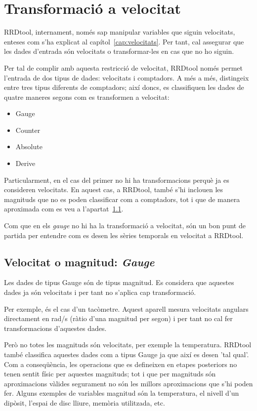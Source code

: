 \section[Transformació]{Transformació a velocitat}
\label{sec:rrdtool-etapes:velocitat}

RRDtool, internament, només sap manipular variables que siguin velocitats, enteses com s'ha explicat al capítol~\ref{cap:velocitats}. Per tant, cal assegurar que les dades d'entrada són velocitats o transformar-les en cas que no ho siguin. 

Per tal de complir amb aquesta restricció de velocitat, RRDtool només permet l'entrada de dos tipus de dades: velocitats i comptadors. A més a més, distingeix entre tres tipus diferents de comptadors; així doncs, es classifiquen les dades de quatre maneres segons com es transformen a velocitat:

\begin{itemize}
\item Gauge 
\item Counter
\item Absolute
\item Derive
\end{itemize}

Particularment, en el cas del primer no hi ha transformacions perquè ja es consideren velocitats. En aquest cas, a RRDtool, també s'hi inclouen les magnituds que no es poden classificar com a comptadors, tot i que de manera aproximada com es veu a l'apartat~\ref{sec:rrdtool-etapes:gauge}.

Com que en els \emph{gauge} no hi ha la transformació a velocitat, són un bon punt de partida per entendre com es desen les sèries temporals en velocitat a RRDtool. 



\subsection{Velocitat o magnitud: \emph{Gauge}}
\label{sec:rrdtool-etapes:gauge}

Les dades de tipus Gauge són de tipus magnitud. Es considera que aquestes dades ja són velocitats i per tant no s'aplica cap transformació. 

Per exemple, és el cas d'un tacòmetre. Aquest aparell mesura velocitats angulars directament en rad/s  (ràtio d'una magnitud per segon) i per tant no cal fer transformacions d'aquestes dades.

Però no totes les magnituds són velocitats, per exemple la temperatura. RRDtool també classifica aquestes dades com a tipus Gauge ja que així es desen 'tal qual'. Com a conseqüència, les operacions que es defineixen en etapes posteriors no tenen sentit físic per aquestes magnituds; tot i que per magnituds són aproximacions vàlides segurament no són les millors aproximacions que s'hi poden fer.
Alguns exemples de variables magnitud són la temperatura, el nivell d'un dipòsit, l'espai de disc lliure, memòria utilitzada, etc.

